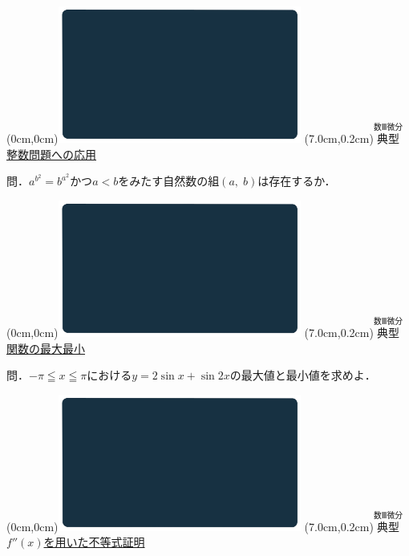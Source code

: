 \documentclass[10pt,
fleqn,
dvipdfmx,
uplatex
]{jsarticle}
\begin{document}
\bf\boldmath



\at(0cm,0cm){\includegraphics[width=8cm,bb=0 0 1920 1080]{./youtube/thumbnails/templates/smart_background/数III微分.jpeg}}
\at(7.0cm,0.2cm){\small\color{bradorange}$\overset{\text{数Ⅲ微分}}{\text{典型}}$}
{\color{orange}\huge\underline{整数問題への応用}}\vspace{0.3zw}

\LARGE 
問．$a^{b^2}=b^{a^2}$かつ$a<b$をみたす自然数の組$\left(a,\;b\right)$は存在するか．


\newpage



\at(0cm,0cm){\includegraphics[width=8cm,bb=0 0 1920 1080]{./youtube/thumbnails/templates/smart_background/数III微分.jpeg}}
\at(7.0cm,0.2cm){\small\color{bradorange}$\overset{\text{数Ⅲ微分}}{\text{典型}}$}
{\color{orange}\huge\underline{関数の最大最小}}\vspace{0.3zw}

\LARGE 
問．$-\pi \leqq x\leqq \pi$における$y=2\sin x+\sin 2x$の最大値と最小値を求めよ．


\newpage



\at(0cm,0cm){\includegraphics[width=8cm,bb=0 0 1920 1080]{./youtube/thumbnails/templates/smart_background/数III微分.jpeg}}
\at(7.0cm,0.2cm){\small\color{bradorange}$\overset{\text{数Ⅲ微分}}{\text{典型}}$}
{\color{orange}\LARGE\underline{$f''\left(x\right)$を用いた不等式証明}}\vspace{0.3zw}
\end{document}
